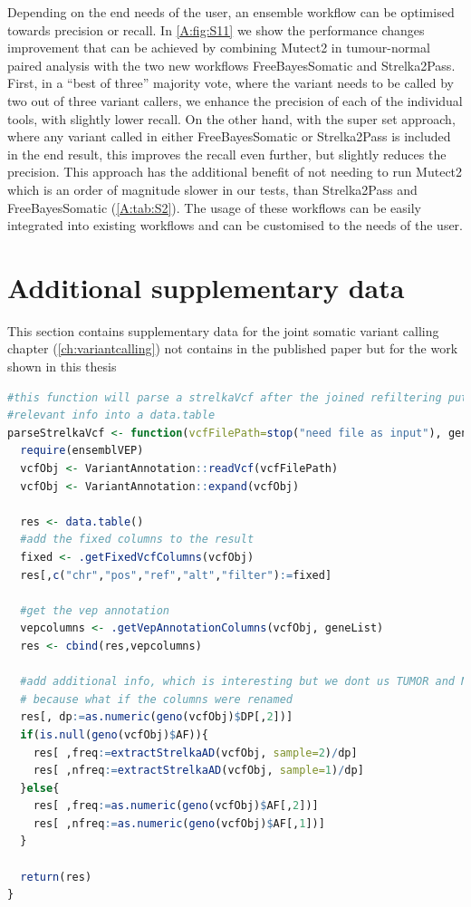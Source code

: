 Depending on the end needs of the user, an ensemble workflow can be optimised towards precision or recall. In \autoref{A:fig:S11} we show the performance changes improvement that can be achieved by combining Mutect2 in tumour-normal paired analysis with the two new workflows FreeBayesSomatic and Strelka2Pass. First, in a “best of three” majority vote, where the variant needs to be called by two out of three variant callers, we enhance the precision of each of the individual tools, with slightly lower recall.
On the other hand, with the super set approach, where any variant called in either FreeBayesSomatic or Strelka2Pass is included in the end result, this improves the recall even further, but slightly reduces the precision. This approach has the additional benefit of not needing to run Mutect2 which is an order of magnitude slower in our tests, than Strelka2Pass and FreeBayesSomatic (\autoref{A:tab:S2}).
The usage of these workflows can be easily integrated into existing workflows and  can be customised to the needs of the user.



\chapter*{Additional supplementary data}
This section contains supplementary data for the joint somatic variant calling chapter (\autoref{ch:variantcalling}) not contains in the published paper but for the work shown in this thesis

\begin{lstlisting}[language=R, caption=parse strelka VCF, label={lst-jvcAppendix:parseVcf}]
#this function will parse a strelkaVcf after the joined refiltering put all the
#relevant info into a data.table
parseStrelkaVcf <- function(vcfFilePath=stop("need file as input"), geneList){
  require(ensemblVEP)
  vcfObj <- VariantAnnotation::readVcf(vcfFilePath)
  vcfObj <- VariantAnnotation::expand(vcfObj)

  res <- data.table()
  #add the fixed columns to the result
  fixed <- .getFixedVcfColumns(vcfObj)
  res[,c("chr","pos","ref","alt","filter"):=fixed]

  #get the vep annotation
  vepcolumns <- .getVepAnnotationColumns(vcfObj, geneList)
  res <- cbind(res,vepcolumns)

  #add additional info, which is interesting but we dont us TUMOR and NORMAL
  # because what if the columns were renamed
  res[, dp:=as.numeric(geno(vcfObj)$DP[,2])]
  if(is.null(geno(vcfObj)$AF)){
    res[ ,freq:=extractStrelkaAD(vcfObj, sample=2)/dp]
    res[ ,nfreq:=extractStrelkaAD(vcfObj, sample=1)/dp]
  }else{
    res[ ,freq:=as.numeric(geno(vcfObj)$AF[,2])]
    res[ ,nfreq:=as.numeric(geno(vcfObj)$AF[,1])]
  }

  return(res)
}
\end{lstlisting}

